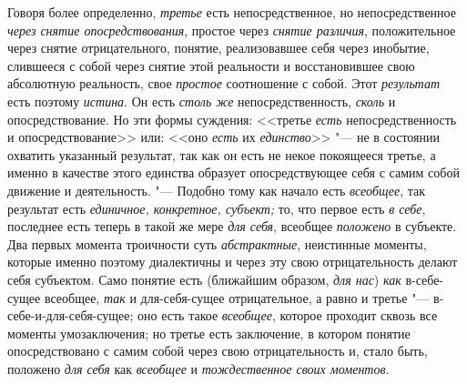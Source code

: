 Говоря более определенно, {\em третье} есть
непосредственное, но непосредственное
{\em через снятие опосредствования}, простое через {\em снятие
различия}, положительное через снятие отрицательного,
понятие, реализовавшее себя через инобытие, слившееся с собой через снятие
этой реальности и восстановившее свою абсолютную реальность, свое
{\em простое} соотношение с собой. Этот {\em результат} есть поэтому
{\em истина}. Он есть {\em столь же} непосредственность, {\em сколь} и
опосредствование. Но эти формы суждения: <<третье {\em есть}
непосредственность и опосредствование>> или: <<оно {\em есть} их
{\em единство}>> "--- не в
состоянии охватить указанный результат, так как он есть не некое покоящееся
третье, а именно в качестве этого единства образует опосредствующее себя с
самим собой движение и деятельность. "--- Подобно тому как
начало есть {\em всеобщее}, так результат есть
{\em единичное, конкретное, субъект;} то, что первое есть {\em в
себе}, последнее есть теперь в такой же мере {\em для себя}, всеобщее
{\em положено} в субъекте. Два первых момента троичности суть
{\em абстрактные}, неистинные моменты, которые именно поэтому диалектичны и
через эту свою отрицательность делают себя субъектом. Само понятие есть
(ближайшим образом, {\em для нас}) {\em как} в-себе-сущее
всеобщее, {\em так} и для-себя-сущее отрицательное, а равно и третье
"--- в-себе-и-для-себя-сущее; оно есть такое {\em всеобщее}, которое
проходит сквозь все моменты умозаключения; но третье есть заключение, в
котором понятие опосредствовано с самим собой через свою отрицательность и,
стало быть, положено {\em для себя} как {\em всеобщее}
и {\em тождественное своих моментов}.

